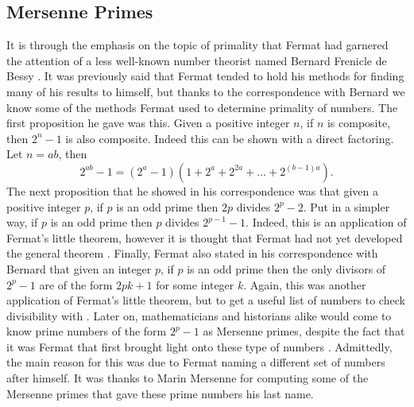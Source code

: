 \documentclass[11pt]{article}
\begin{document}
\subsection*{Mersenne Primes}
It is through the emphasis on the topic of primality that Fermat had garnered the
attention of a less well-known number theorist named
Bernard Frenicle de Bessy \cite{Mahoney}.
It was previously said that Fermat tended to hold his methods for finding many
of his results to himself, but thanks to the correspondence with Bernard we
know some of the methods Fermat used to determine primality of numbers.
The first proposition he gave was this.
Given a positive integer $n$, if $n$ is composite, then $2^n - 1$ is also 
composite.
Indeed this can be shown with a direct factoring.
Let $n = ab$, then
\[2^{ab} - 1 = (2^a - 1)(1 + 2^a + 2^{2a} + \dots +2^{(b-1)a} ). \]
The next proposition that he showed in his correspondence was that given a 
positive integer $p$, if $p$ is an odd prime then $2p$ divides $2^p-2$.
Put in a simpler way, if $p$ is an odd prime then $p$ divides $2^{p-1} - 1$.
Indeed, this is an application of Fermat's little theorem, however it is thought
that Fermat had not yet developed the general theorem \cite{Ball, Mahoney}.
Finally, Fermat also stated in his correspondence with Bernard that given an
integer $p$, if $p$ is an odd prime then the only divisors of $2^p -1$ are of
the form $2pk +1$ for some integer $k$.
Again, this was another application of Fermat's little theorem, but to get a
useful list of numbers to check divisibility with \cite{MersennePrime}.
Later on, mathematicians and historians alike would come to know prime numbers
of the form $2^p -1$ as Mersenne primes, despite the fact that it was Fermat
that first brought light onto these type of numbers \cite{Mahoney}.
Admittedly, the main reason for this was due to Fermat naming a different set
of numbers after himself.
It was thanks to Marin Mersenne for computing some of the Mersenne primes that
gave these prime numbers his last name.
\end{document}
